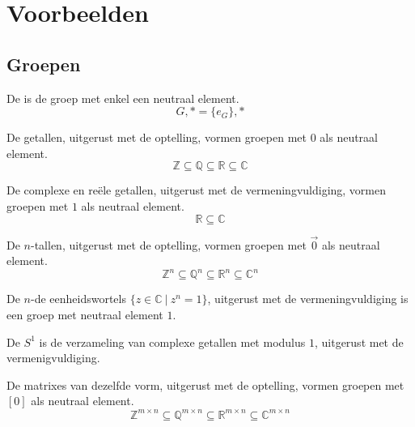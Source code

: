 \documentclass[main.tex]{subfiles}
\begin{document}
\chapter{Voorbeelden}
\label{cha:voorbeelden}

\section{Groepen}
\label{sec:groepen}

\begin{de}
  De  is de groep met enkel een neutraal element.
  \[ G,* = \{ e_{G} \},* \]
\commj
\end{de}

\begin{vb}
  De getallen, uitgerust met de optelling, vormen groepen met $0$ als neutraal element.
  \[ \mathbb{Z} \subseteq \mathbb{Q} \subseteq \mathbb{R} \subseteq \mathbb{C} \]
\commj
\end{vb}

\begin{vb}
  De complexe en re\"ele getallen, uitgerust met de vermeningvuldiging, vormen groepen met $1$ als neutraal element.
  \[ \mathbb{R} \subseteq \mathbb{C} \]
\commj
\end{vb}

\begin{vb}
  De $n$-tallen, uitgerust met de optelling, vormen groepen met $\vec{0}$ als neutraal element.
  \[ \mathbb{Z}^{n} \subseteq \mathbb{Q}^{n} \subseteq \mathbb{R}^{n} \subseteq \mathbb{C}^{n} \]
\commj
\end{vb}

\begin{vb}
  De $n$-de eenheidswortels $\{ z \in \mathbb{C}\ |\ z^{n} = 1 \}$, uitgerust met de vermeningvuldiging is een groep met neutraal element $1$.
\end{vb}

\begin{de}
  De  $S^{1}$ is de verzameling van complexe getallen met modulus $1$, uitgerust met de vermenigvuldiging.
\end{de}

\begin{vb}
  De matrixes van dezelfde vorm, uitgerust met de optelling, vormen groepen met $[0]$ als neutraal element.
  \[ \mathbb{Z}^{m \times n} \subseteq \mathbb{Q}^{m \times n} \subseteq \mathbb{R}^{m \times n} \subseteq \mathbb{C}^{m \times n} \]
\commj
\end{vb}
\end{document}

